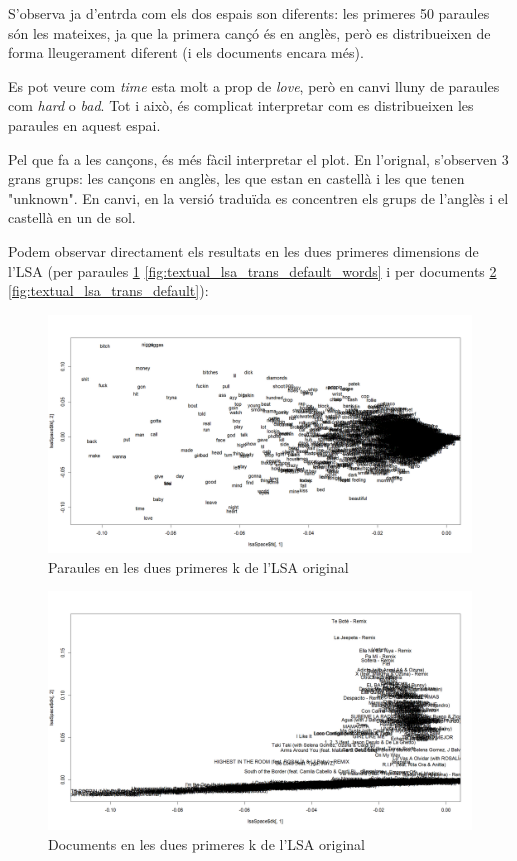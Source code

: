 S'observa ja d'entrda com els dos espais son diferents: les primeres 50 paraules són les mateixes, ja que la primera cançó és en anglès, però es distribueixen de forma lleugerament diferent (i els documents encara més).

Es pot veure com \textit{time} esta molt a prop de \textit{love}, però en canvi lluny de paraules com \textit{hard} o \textit{bad}. Tot i això, és complicat interpretar com es distribueixen les paraules en aquest espai.

Pel que fa a les cançons, és més fàcil interpretar el plot. En l'orignal, s'observen 3 grans grups: les cançons en anglès, les que estan en castellà i les que tenen "unknown". En canvi, en la versió traduïda es concentren els grups de l'anglès i el castellà en un de sol.

Podem observar directament els resultats en les dues primeres dimensions de l'LSA (per paraules \ref{fig:textual_lsa_original_default_words} \ref{fig:textual_lsa_trans_default_words} i per documents \ref{fig:textual_lsa_original_default} \ref{fig:textual_lsa_trans_default}):

\begin{figure}[H]
    \centering
    \includegraphics[width=0.8\linewidth]{Images//8_Textual//LSA/lsa_default_space_words.png}
    \caption{Paraules en les dues primeres k de l'LSA original}
    \label{fig:textual_lsa_original_default_words}
\end{figure}

\begin{figure}[H]
    \centering
    \includegraphics[width=0.8\linewidth]{Images//8_Textual//LSA/original_lsa_default_space.png}
    \caption{Documents en les dues primeres k de l'LSA original}
    \label{fig:textual_lsa_original_default}
\end{figure}

